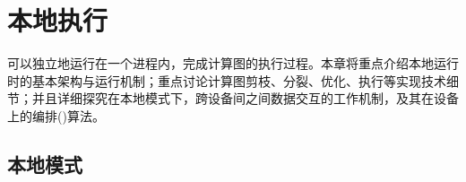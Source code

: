 \begin{savequote}[45mm]
\end{savequote}

\chapter{本地执行} 
\label{ch:local}

\begin{content}

\tf{}可以独立地运行在一个进程内，完成计算图的执行过程。本章将重点介绍本地运行时的基本架构与运行机制；重点讨论计算图剪枝、分裂、优化、执行等实现技术细节；并且详细探究在本地模式下，跨设备间之间数据交互的工作机制，及其在设备上的编排()算法。

\end{content}

\section{本地模式}

